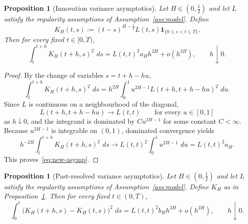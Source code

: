 \documentclass[11pt,a4paper]{amsart}
\theoremstyle{plain}
\newtheorem{proposition}[theorem]{Proposition}
\theoremstyle{definition}
\theoremstyle{remark}
\newcommand{\dd}{\,d}
\newcommand{\one}{\mathbf 1}
\begin{document}
\begin{proposition}[Innovation variance asymptotics]\label{prop:new}
Let $H\in(0,\tfrac12)$ and let $L$ satisfy the regularity assumptions of
Assumption~\ref{ass:model}. Define
\[
K_H(t,s):=(t-s)^{H-\frac12}L(t,s)\one_{\{0\le s<t\le T\}}.
\]
Then for every fixed $t\in[0,T)$,
\begin{equation}\label{eq:new-asymp}
\int_t^{t+h} K_H(t+h,s)^2\,\dd s
=
L(t,t)^2 a_H h^{2H}+o(h^{2H}),
\qquad h\downarrow0.
\end{equation}
\end{proposition}

\begin{proof}
By the change of variables $s=t+h-hu$,
\[
\int_t^{t+h} K_H(t+h,s)^2\,\dd s
=
h^{2H}\int_0^1 u^{2H-1}L(t+h,t+h-hu)^2\,\dd u.
\]
Since $L$ is continuous on a neighbourhood of the diagonal,
\[
L(t+h,t+h-hu)\to L(t,t)
\qquad\text{for every }u\in[0,1]
\]
as $h\downarrow0$, and the integrand is dominated by
$C u^{2H-1}$ for some constant $C<\infty$. Because $u^{2H-1}$ is integrable on $(0,1)$,
dominated convergence yields
\[
h^{-2H}\int_t^{t+h} K_H(t+h,s)^2\,\dd s
\longrightarrow
L(t,t)^2\int_0^1 u^{2H-1}\,\dd u
=
L(t,t)^2 a_H.
\]
This proves~\eqref{eq:new-asymp}.
\end{proof}

\begin{proposition}[Past-resolved variance asymptotics]\label{prop:old}
Let $H\in(0,\tfrac12)$ and let $L$ satisfy the regularity assumptions of
Assumption~\ref{ass:model}. Define $K_H$ as in Proposition~\ref{prop:new}. Then for every
fixed $t\in(0,T)$,
\begin{equation}\label{eq:old-asymp}
\int_0^t \bigl(K_H(t+h,s)-K_H(t,s)\bigr)^2\,\dd s
=
L(t,t)^2 b_H h^{2H}+o(h^{2H}),
\qquad h\downarrow0.
\end{equation}
\end{proposition}
\end{document}
